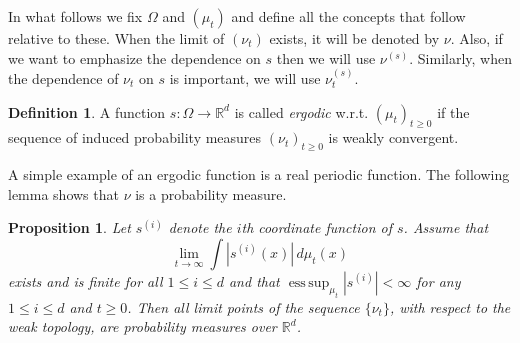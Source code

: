 \documentclass[twoside]{article}
\newcommand{\real}{\mathbb{R}}
\DeclareMathOperator{\esssup}{ess\,sup}
\newtheorem{prop}[lemma]{Proposition}
\theoremstyle{definition}
\newtheorem{definition}[lemma]{Definition}
\begin{document}
In what follows we fix $\Omega$ and $(\mu_t)$ and define all the concepts that follow relative to these. When the limit of $(\nu_t)$ exists, it will be denoted by $\nu$.
Also, if we want to emphasize the dependence on $s$ then we will use $\nu^{(s)}$.
Similarly, when the dependence of $\nu_t$ on $s$ is important, we will use $\nu^{(s)}_t$.


\begin{definition}
A function $s:\Omega \rightarrow \real^d$ is called \emph{ergodic} w.r.t. $(\mu_t)_{t\ge0}$
if the sequence of  induced probability measures $(\nu_t)_{t\ge 0}$ is weakly convergent.
\end{definition}
A simple example of an ergodic function is a real periodic function.
The following lemma shows that $\nu$ is a probability measure. 
\begin{prop}
\label{lem:ergodicfunction}
Let $s^{(i)}$ denote the $i$th coordinate function of $s$. Assume that
\begin{equation}
\label{eq:ergodicproperty}
\lim_{t\to\infty} \int |s^{(i)}(x)|\, d\mu_t(x) 
\end{equation}
exists and is finite for all $1 \le i \le d$ and that $\esssup_{\mu_t} |s^{(i)}|<\infty$ for any $1\le i \le d$ and $t\ge 0$.
Then all limit points of the sequence $\{\nu_t\}$, with respect to the weak topology, are probability measures over $\real^d$.
\end{prop}
\end{document}
